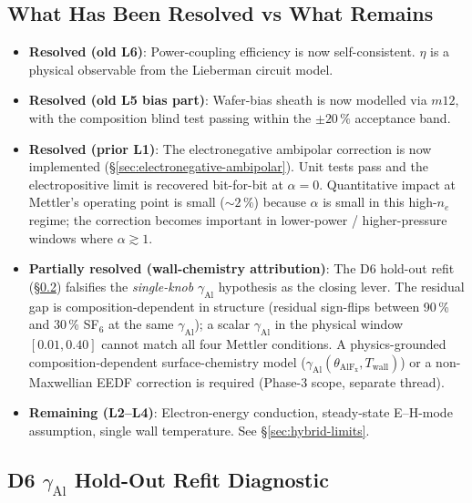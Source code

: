 \documentclass[11pt,a4paper]{report}
\begin{document}
\subsection{What Has Been Resolved vs What Remains}

\begin{itemize}
  \item \textbf{Resolved (old L6)}: Power-coupling efficiency is now self-consistent.  $\eta$ is a physical observable from the Lieberman circuit model.
  \item \textbf{Resolved (old L5 bias part)}: Wafer-bias sheath is now modelled via $m12$, with the composition blind test passing within the $\pm 20\,\%$ acceptance band.
  \item \textbf{Resolved (prior L1)}: The electronegative ambipolar correction is now implemented (\S\ref{sec:electronegative-ambipolar}).  Unit tests pass and the electropositive limit is recovered bit-for-bit at $\alpha=0$.  Quantitative impact at Mettler's operating point is small ($\sim 2\,\%$) because $\alpha$ is small in this high-$n_e$ regime; the correction becomes important in lower-power / higher-pressure windows where $\alpha \gtrsim 1$.
  \item \textbf{Partially resolved (wall-chemistry attribution)}: The D6 hold-out refit (\S\ref{sec:d6-gamma-al-refit}) falsifies the \emph{single-knob} $\gamma_\mathrm{Al}$ hypothesis as the closing lever.  The residual gap is composition-dependent in structure (residual sign-flips between 90\,\% and 30\,\% SF$_6$ at the same $\gamma_\mathrm{Al}$); a scalar $\gamma_\mathrm{Al}$ in the physical window $[0.01,0.40]$ cannot match all four Mettler conditions.  A physics-grounded composition-dependent surface-chemistry model ($\gamma_\mathrm{Al}(\theta_\mathrm{AlF_x}, T_\mathrm{wall})$) or a non-Maxwellian EEDF correction is required (Phase-3 scope, separate thread).
  \item \textbf{Remaining (L2--L4)}: Electron-energy conduction, steady-state E--H-mode assumption, single wall temperature.  See \S\ref{sec:hybrid-limits}.
\end{itemize}


\subsection{D6 \texorpdfstring{$\gamma_\mathrm{Al}$}{gamma\_Al} Hold-Out Refit Diagnostic}
\label{sec:d6-gamma-al-refit}
\end{document}
